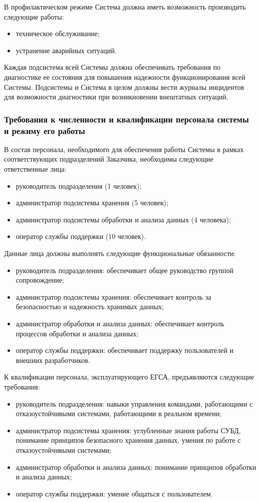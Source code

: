 \documentclass[a4paper, 14pt]{extarticle}
\begin{document}
В профилактическом режиме Система должна иметь возможность производить следующие
работы:
\begin{itemize}
  \item техническое обслуживание;
  \item устранение аварийных ситуаций.
\end{itemize}

Каждая подсистема всей Системы должна обеспечивать требования по диагностике ее
состояния для повышения надежности функционирования всей Системы. Подсистемы и
Система в целом должны вести журналы инцидентов для возможности диагностики при
возникновении внештатных ситуаций.

\subsubsection{Требования к численности и квалификации персонала
  системы и режиму его работы}

В состав персонала, необходимого для обеспечения работы Системы в рамках
соответствующих подразделений Заказчика, необходимы следующие ответственные
лица:
\begin{itemize}
  \item руководитель подразделения (1 человек);
  \item администратор подсистемы хранения (5 человек);
  \item администратор подсистемы обработки и анализа данных (4 человека);
  \item оператор службы поддержки (10 человек).
\end{itemize}

Данные лица должны выполнять следующие функциональные обязанности:
\begin{itemize}
  \item руководитель подразделения: обеспечивает общее руководство группой
  сопровождение;
  \item администратор подсистемы хранения: обеспечивает контроль за
  безопасностью и надежность хранимых данных;
  \item администратор обработки и анализа данных: обеспечивает контроль
  процессов обработки и анализа данных;
  \item оператор службы поддержки: обеспечивает поддержку пользователей и
  внешних разработчиков.
\end{itemize}

К квалификации персонала, эксплуатирующего ЕГСА, предъявляются следующие
требования:
\begin{itemize}
  \item руководитель подразделения: навыки управления командами, работающими с
  отказоустойчивыми системами, работающими в реальном времени;
  \item администратор подсистемы хранения: углубленные знания работы СУБД,
  понимание принципов безопасного хранения данных, умения по работе с
  отказоустойчивыми системами;
  \item администратор обработки и анализа данных: понимание принципов обработки
  и анализа данных;
  \item оператор службы поддержки: умение общаться с пользователем.
\end{itemize}
\end{document}
